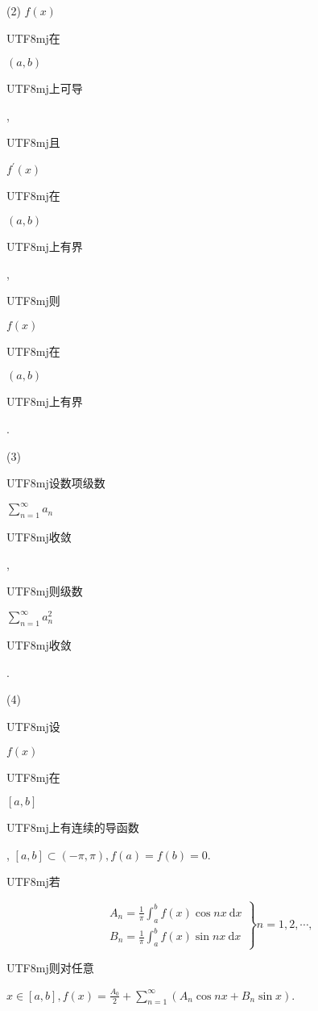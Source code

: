 \documentclass[10pt]{article}
\begin{document}
(2) $f(x)$ \begin{CJK}{UTF8}{mj}在\end{CJK} $(a, b)$ \begin{CJK}{UTF8}{mj}上可导\end{CJK}, \begin{CJK}{UTF8}{mj}且\end{CJK} $f^{\prime}(x)$ \begin{CJK}{UTF8}{mj}在\end{CJK} $(a, b)$ \begin{CJK}{UTF8}{mj}上有界\end{CJK}, \begin{CJK}{UTF8}{mj}则\end{CJK} $f(x)$ \begin{CJK}{UTF8}{mj}在\end{CJK} $(a, b)$ \begin{CJK}{UTF8}{mj}上有界\end{CJK}.

(3) \begin{CJK}{UTF8}{mj}设数项级数\end{CJK} $\sum_{n=1}^{\infty} a_{n}$ \begin{CJK}{UTF8}{mj}收敛\end{CJK}, \begin{CJK}{UTF8}{mj}则级数\end{CJK} $\sum_{n=1}^{\infty} a_{n}^{2}$ \begin{CJK}{UTF8}{mj}收敛\end{CJK}.

(4) \begin{CJK}{UTF8}{mj}设\end{CJK} $f(x)$ \begin{CJK}{UTF8}{mj}在\end{CJK} $[a, b]$ \begin{CJK}{UTF8}{mj}上有连续的导函数\end{CJK}, $[a, b] \subset(-\pi, \pi), f(a)=f(b)=0$. \begin{CJK}{UTF8}{mj}若\end{CJK}
$$
\left.\begin{array}{l}
A_{n}=\frac{1}{\pi} \int_{a}^{b} f(x) \cos n x \mathrm{~d} x \\
B_{n}=\frac{1}{\pi} \int_{a}^{b} f(x) \sin n x \mathrm{~d} x
\end{array}\right\} n=1,2, \cdots,
$$
\begin{CJK}{UTF8}{mj}则对任意\end{CJK} $x \in[a, b], f(x)=\frac{A_{0}}{2}+\sum_{n=1}^{\infty}\left(A_{n} \cos n x+B_{n} \sin x\right)$.
\end{document}

